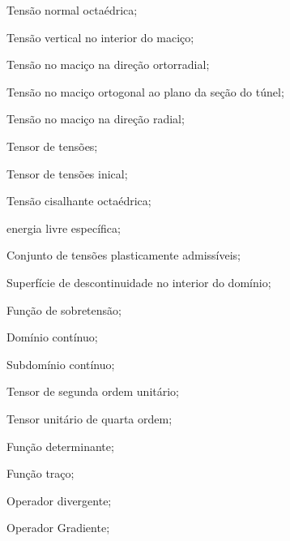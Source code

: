 \item[$ \sigma_{oct} $] 	Tensão normal octaédrica;
\item[$ \sigma_{v} $] 	Tensão vertical no interior do maciço;
\item[$ \sigma_{\theta \theta} $] Tensão no maciço na direção ortorradial;
\item[$ \sigma_{zz} $] 	Tensão no maciço ortogonal ao plano da seção do túnel;
\item[$ \sigma_{rr} $] 	Tensão no maciço na direção radial;
\item[$ \sigmall $] 	Tensor de tensões;
\item[$ \sigmall_0 $] 	Tensor de tensões inical;
\item[$ \tau_{oct} $] 	Tensão cisalhante octaédrica;
\item[$\psi$] energia livre específica;

\item[\textbf{Grego maiúsculo:}]
\item[$ \Gamma $]		Conjunto de tensões plasticamente admissíveis;
\item[$ \Sigma $]		Superfície de descontinuidade no interior do domínio;
\item[$ \Phi $]		Função de sobretensão;
\item[$ \Omega $] 		Domínio contínuo;
\item[$ \Omega' $] 		Subdomínio contínuo;

\item[\textbf{Numéricos, operadores e funções matemáticas:}]
\item[$ \Umll $] 	Tensor de segunda ordem unitário;
\item[$\Umllll$] Tensor unitário de quarta ordem;
\item[det($\cdot$)] 	Função determinante;
\item[tr($\cdot$)] 	Função traço;
\item[$ \divl $] 	Operador divergente;
\item[$ \nabla $] 	Operador Gradiente;


















